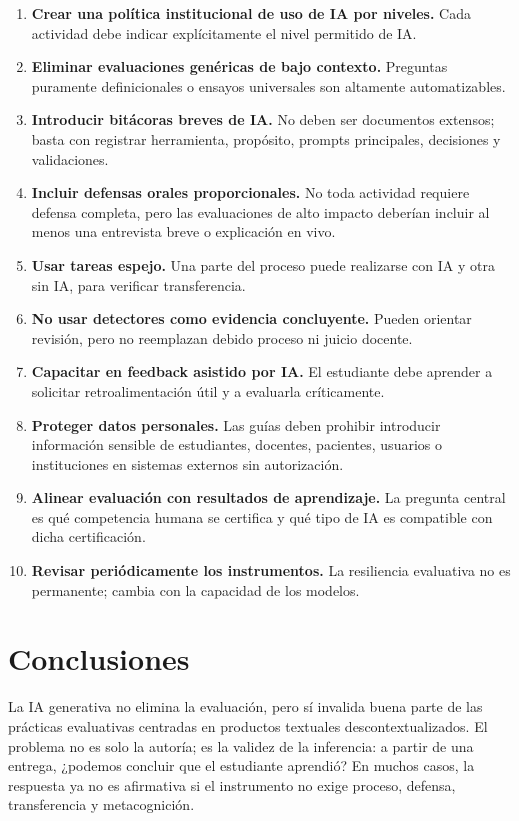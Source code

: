 \documentclass[
  spanish,
  letterpaper,
  DIV=11,
  numbers=noendperiod]{scrartcl}
\providecommand{\tightlist}{%
  \setlength{\itemsep}{0pt}\setlength{\parskip}{0pt}}
\begin{document}
\begin{enumerate}
\def\labelenumi{\arabic{enumi}.}
\tightlist
\item
  \textbf{Crear una política institucional de uso de IA por niveles.}
  Cada actividad debe indicar explícitamente el nivel permitido de IA.
\item
  \textbf{Eliminar evaluaciones genéricas de bajo contexto.} Preguntas
  puramente definicionales o ensayos universales son altamente
  automatizables.
\item
  \textbf{Introducir bitácoras breves de IA.} No deben ser documentos
  extensos; basta con registrar herramienta, propósito, prompts
  principales, decisiones y validaciones.
\item
  \textbf{Incluir defensas orales proporcionales.} No toda actividad
  requiere defensa completa, pero las evaluaciones de alto impacto
  deberían incluir al menos una entrevista breve o explicación en vivo.
\item
  \textbf{Usar tareas espejo.} Una parte del proceso puede realizarse
  con IA y otra sin IA, para verificar transferencia.
\item
  \textbf{No usar detectores como evidencia concluyente.} Pueden
  orientar revisión, pero no reemplazan debido proceso ni juicio
  docente.
\item
  \textbf{Capacitar en feedback asistido por IA.} El estudiante debe
  aprender a solicitar retroalimentación útil y a evaluarla
  críticamente.
\item
  \textbf{Proteger datos personales.} Las guías deben prohibir
  introducir información sensible de estudiantes, docentes, pacientes,
  usuarios o instituciones en sistemas externos sin autorización.
\item
  \textbf{Alinear evaluación con resultados de aprendizaje.} La pregunta
  central es qué competencia humana se certifica y qué tipo de IA es
  compatible con dicha certificación.
\item
  \textbf{Revisar periódicamente los instrumentos.} La resiliencia
  evaluativa no es permanente; cambia con la capacidad de los modelos.
\end{enumerate}

\section{Conclusiones}\label{conclusiones}

La IA generativa no elimina la evaluación, pero sí invalida buena parte
de las prácticas evaluativas centradas en productos textuales
descontextualizados. El problema no es solo la autoría; es la validez de
la inferencia: a partir de una entrega, ¿podemos concluir que el
estudiante aprendió? En muchos casos, la respuesta ya no es afirmativa
si el instrumento no exige proceso, defensa, transferencia y
metacognición.
\end{document}
